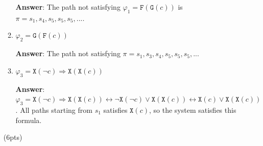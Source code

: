 \documentclass[11pt]{article}
\newcommand{\lx}[1]{\texttt{X}(#1)}
\newcommand{\lf}[1]{\texttt{F}(#1)}
\newcommand{\llg}[1]{\texttt{G}(#1)}
\begin{document}
\begin{enumerate}
\begin{enumerate}
\textbf{Answer}: The path not satisfying $\varphi_1 = \lf{\llg{c}}$ is \(\pi = s_1,s_4,s_5,s_5,s_5,...\). 

\item $\varphi_2 = \llg{\lf{c}}$

\textbf{Answer}: The path not satisfying \(\pi = s_1,s_3,s_4,s_5,s_5,s_5,...\)
\item $\varphi_3 = \lx{\neg c} \Rightarrow \lx{\lx{c}}$

\textbf{Answer}: \(\varphi_3 = \lx{\neg c} \Rightarrow \lx{\lx{c}} \leftrightarrow \neg \lx{\neg c} \lor \lx{\lx{c}} \leftrightarrow \lx{c} \lor \lx{\lx{c}} \). 
All paths starting from $s_1$ satisfies $\lx{c}$, so the system 
satisfies this formula. 
\end{enumerate}
\hfill(6pts)
\end{enumerate}
\end{document}
